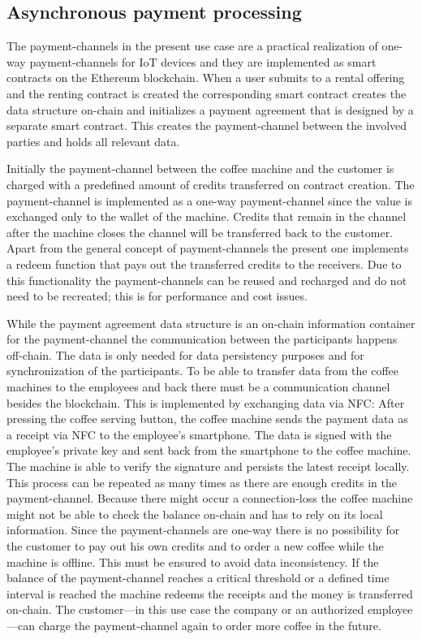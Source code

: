 \documentclass[conference]{IEEEtran}
\begin{document}
%
\subsection{Asynchronous payment processing}

The payment-channels in the present use case are a practical realization of one-way payment-channels for IoT devices and they are implemented as smart contracts on the Ethereum blockchain. When a user submits to a rental offering and the renting contract is created the corresponding smart contract creates the data structure on-chain and initializes a payment agreement that is designed by a separate smart contract. This creates the payment-channel between the involved parties and holds all relevant data.

Initially the payment-channel between the coffee machine and the customer is charged with a predefined amount of credits transferred on contract creation. The payment-channel is implemented as a one-way payment-channel since the value is exchanged only to the wallet of the machine. Credits that remain in the channel after the machine closes the channel will be transferred back to the customer. Apart from the general concept of payment-channels the present one implements a redeem function that pays out the transferred credits to the receivers. Due to this functionality the payment-channels can be reused and recharged and do not need to be recreated; this is for performance and cost issues.

While the payment agreement data structure is an on-chain information container for the payment-channel the communication between the participants happens off-chain. The data is only needed for data persistency purposes and for synchronization of the participants. To be able to transfer data from the coffee machines to the employees and back there must be a communication channel besides the blockchain. This is implemented by exchanging data via NFC: After pressing the coffee serving button, the coffee machine sends the payment data as a receipt via NFC to the employee's smartphone. The data is signed with the employee's private key and sent back from the smartphone to the coffee machine. The machine is able to verify the signature and persists the latest receipt locally. This process can be repeated as many times as there are enough credits in the payment-channel. Because there might occur a connection-loss the coffee machine might not be able to check the balance on-chain and has to rely on its local information. Since the payment-channels are one-way there is no possibility for the customer to pay out his own credits and to order a new coffee while the machine is offline. This must be ensured to avoid data inconsistency. If the balance of the payment-channel reaches a critical threshold or a defined time interval is reached the machine redeems the receipts and the money is transferred on-chain. The customer---in this use case the company or an authorized employee---can charge the payment-channel again to order more coffee in the future.
\end{document}
